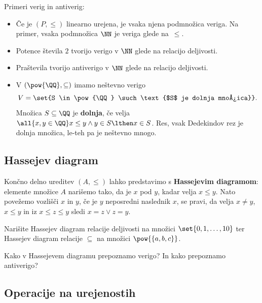 \begin{zgled}
  Primeri verig in antiverig:
  \begin{itemize}
  \item Če je $(P, {\leq})$ linearno urejena, je vsaka njena podmnožica veriga. Na primer, vsaka podmnožica $\NN$ je veriga glede na~$\leq$.
  \item Potence števila $2$ tvorijo verigo v $\NN$ glede na relacijo deljivosti.
  \item Praštevila tvorijo antiverigo v $\NN$ glede na relacijo deljivosti.
  \item V $(\pow{\QQ}, {\subseteq})$ imamo neštevno verigo
    \begin{equation*}
      V = \set{S \in \pow{\QQ} \such \text{$S$ je dolnja množica}}.
    \end{equation*}
    Množica $S \subseteq \QQ$ je \textbf{dolnja}, če velja
    $\all{x, y \in \QQ} x \leq y \land y \in S \lthen x \in S$.
    Res, vsak Dedekindov rez je dolnja množica, le-teh pa je neštevno mnogo.
  \end{itemize}
\end{zgled}



\subsection{Hassejev diagram}

Končno delno ureditev $(A, \leq)$ lahko predstavimo s \textbf{Hassejevim diagramom}: elemente
množice $A$ narišemo tako, da je $x$ pod $y$, kadar velja $x \leq y$. Nato povežemo vozlišči $x$ in $y$, če je $y$ neposredni naslednik $x$, se pravi, da velja $x \neq y$, $x \leq y$ in iz $x \leq z \leq y$ sledi $x = z \lor z = y$.

\begin{vaja}
  Narišite Hassejev diagram relacije deljivosti na množici $\set{0, 1, \dots, 10}$ ter
  Hassejev diagram relacije $\subseteq$ na množici $\pow{\{a,b,c\}}$.
\end{vaja}

\begin{vaja}
  Kako v Hassejevem diagramu prepoznamo verigo? In kako prepoznamo antiverigo?
\end{vaja}


\subsection{Operacije na urejenostih}

